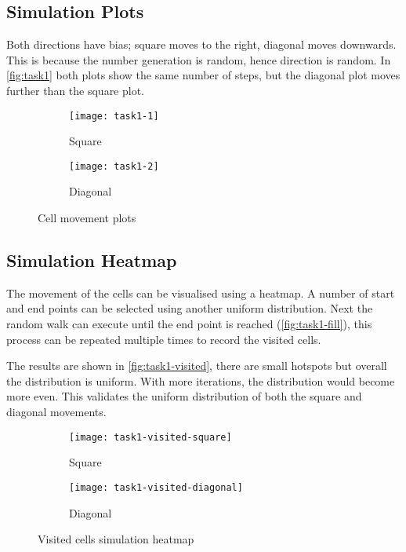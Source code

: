 \subsection{Simulation Plots}

Both directions have bias; square moves to the right, diagonal moves downwards.
This is because the number generation is random, hence direction is random.
In \autoref{fig:task1} both plots show the same number of steps, but the diagonal plot moves further than the square plot.

\begin{figure}[!ht]
    \centering
    \begin{subfigure}{0.4\textwidth}
    	\texttt{[image: task1-1]}
    	\caption[Square]{Square}
    	\label{fig:task1-1}
    \end{subfigure}
    \begin{subfigure}{0.4\textwidth}
    	\texttt{[image: task1-2]}
    	\caption[Diagonal]{Diagonal}
    	\label{fig:task1-2}
	\end{subfigure}
	\caption[Cell movement plots]{Cell movement plots}
    \label{fig:task1}
\end{figure}

\clearpage

\subsection{Simulation Heatmap}

The movement of the cells can be visualised using a heatmap.
A number of start and end points can be selected using another uniform distribution.
Next the random walk can execute until the end point is reached (\autoref{fig:task1-fill}),
this process can be repeated multiple times to record the visited cells.


The results are shown in \autoref{fig:task1-visited}, there are small hotspots but overall the distribution is uniform.
With more iterations, the distribution would become more even.
This validates the uniform distribution of both the square and diagonal movements.

\begin{figure}[ht]
    \centering
    \begin{subfigure}{0.45\textwidth}
        \texttt{[image: task1-visited-square]}
        \caption[Square]{Square}
        \label{fig:task1-visited-square}
    \end{subfigure}
    \begin{subfigure}{0.45\textwidth}
        \texttt{[image: task1-visited-diagonal]}
        \caption[Diagonal]{Diagonal}
        \label{fig:task1-visited-diagonal}
    \end{subfigure}
    \caption[Visited cells simulation heatmap]{Visited cells simulation heatmap}
    \label{fig:task1-visited}
\end{figure}

